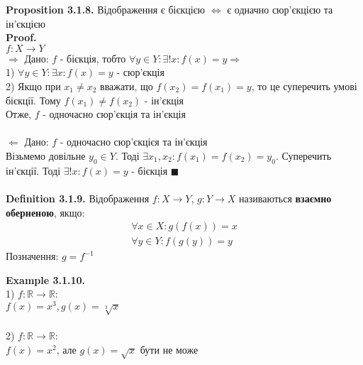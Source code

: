 \documentclass[a4paper, 14pt]{extarticle}
\def\qed{$\blacksquare$}
\begin{document}
	\textbf{Proposition 3.1.8.} Відображення є бієкцією $\iff$ є одначно сюр'єкцією та ін'єкцією\\
	\textbf{Proof.} \\
	$f: X \to Y$\\
	$\boxed{\Rightarrow}$ Дано: $f$ - бієкція, тобто $\forall y \in Y: \exists! x: f(x) = y \Rightarrow $\\
	1) $\forall y \in Y: \exists x: f(x) = y$ - сюр'єкція\\
	2) Якщо при $x_1 \neq x_2$ вважати, що $f(x_2) = f(x_1) = y$, то це суперечить умові бієкції. Тому $f(x_1) \neq f(x_2)$ - ін'єкція\\
	Отже, $f$ - одночасно сюр'єкція та ін'єкція\\
	\\
	$\boxed{\Leftarrow}$ Дано: $f$ - одночасно сюр'єкцієя та ін'єкція\\
	Візьмемо довільне $y_0 \in Y$. Тоді $\exists x_1, x_2: f(x_1) = f(x_2) = y_0$. Суперечить ін'єкції. Тоді $\exists! x: f(x) = y$ - бієкція \qed
	\\
	\\
	\textbf{Definition 3.1.9.} Відображення $f: X \to Y$, $g: Y \to X$ називаються \textbf{взаємно оберненою}, якщо:
	\begin{align*}
	\forall x \in X: g(f(x)) = x \\
	\forall y \in Y: f(g(y)) = y
	\end{align*}
	Позначення: $g = f^{-1}$\\
\begin{figure}[H]
\end{figure}
	\textbf{Example 3.1.10.}\\
	1) $f: \mathbb{R} \to \mathbb{R}$:\\
	$f(x) = x^3, g(x) = \sqrt[3]{x}$\\ \\
	2) $f: \mathbb{R} \to \mathbb{R}$:\\
	$f(x) = x^2$, але $g(x) = \sqrt{x}$ бути не може\\
\end{document}
